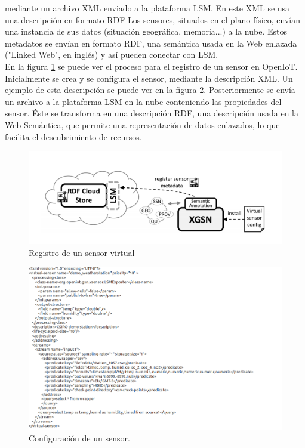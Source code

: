 \documentclass[12pt, twoside]{book}
\begin{document}
mediante un archivo XML enviado a la plataforma LSM. En este XML se usa una descripción en formato RDF
Los sensores, situados en el plano físico, envían una instancia de sus datos (situación geográfica, memoria...) a la nube. Estos metadatos se envían en formato RDF, una semántica usada en la Web enlazada ("Linked Web", en inglés) y así pueden conectar con LSM.\\

En la figura \ref{L403} se puede ver el proceso para el registro de un sensor en OpenIoT. Inicialmente se crea y se configura el sensor, mediante la descripción XML. Un ejemplo de esta descripción se puede ver en la figura \ref{L404}. Posteriormente se envía un archivo a la plataforma LSM en la nube conteniendo las propiedades del sensor. Éste se transforma en una descripción RDF, una descripción usada en la Web Semántica, que permite una representación de datos enlazados, lo que facilita el descubrimiento de recursos.
\begin{figure}[H]
\centering
\includegraphics[scale=0.4]{images/registration_capture}
\caption{Registro de un sensor virtual}\label{L403}
\end{figure}
\begin{figure}[H]
\centering
\includegraphics[scale=0.5]{images/configuration_capture}
\caption{Configuración de un sensor.}\label{L404}
\end{figure}
\end{document}
